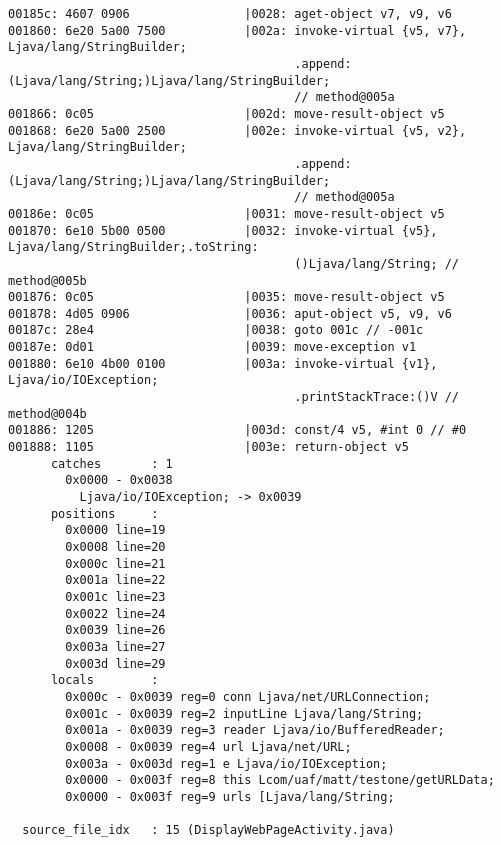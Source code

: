 \begin{lstlisting}
00185c: 4607 0906                |0028: aget-object v7, v9, v6
001860: 6e20 5a00 7500           |002a: invoke-virtual {v5, v7}, Ljava/lang/StringBuilder;
                                        .append:(Ljava/lang/String;)Ljava/lang/StringBuilder;
                                        // method@005a
001866: 0c05                     |002d: move-result-object v5
001868: 6e20 5a00 2500           |002e: invoke-virtual {v5, v2}, Ljava/lang/StringBuilder;
                                        .append:(Ljava/lang/String;)Ljava/lang/StringBuilder;
                                        // method@005a
00186e: 0c05                     |0031: move-result-object v5
001870: 6e10 5b00 0500           |0032: invoke-virtual {v5}, Ljava/lang/StringBuilder;.toString:
                                        ()Ljava/lang/String; // method@005b
001876: 0c05                     |0035: move-result-object v5
001878: 4d05 0906                |0036: aput-object v5, v9, v6
00187c: 28e4                     |0038: goto 001c // -001c
00187e: 0d01                     |0039: move-exception v1
001880: 6e10 4b00 0100           |003a: invoke-virtual {v1}, Ljava/io/IOException;
                                        .printStackTrace:()V // method@004b
001886: 1205                     |003d: const/4 v5, #int 0 // #0
001888: 1105                     |003e: return-object v5
      catches       : 1
        0x0000 - 0x0038
          Ljava/io/IOException; -> 0x0039
      positions     :
        0x0000 line=19
        0x0008 line=20
        0x000c line=21
        0x001a line=22
        0x001c line=23
        0x0022 line=24
        0x0039 line=26
        0x003a line=27
        0x003d line=29
      locals        :
        0x000c - 0x0039 reg=0 conn Ljava/net/URLConnection;
        0x001c - 0x0039 reg=2 inputLine Ljava/lang/String;
        0x001a - 0x0039 reg=3 reader Ljava/io/BufferedReader;
        0x0008 - 0x0039 reg=4 url Ljava/net/URL;
        0x003a - 0x003d reg=1 e Ljava/io/IOException;
        0x0000 - 0x003f reg=8 this Lcom/uaf/matt/testone/getURLData;
        0x0000 - 0x003f reg=9 urls [Ljava/lang/String;

  source_file_idx   : 15 (DisplayWebPageActivity.java)
\end{lstlisting}
